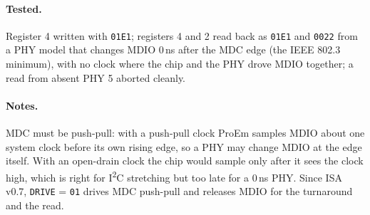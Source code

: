 \documentclass[11pt,a4paper]{article}
\newcommand{\sig}[1]{\texttt{#1}}
\begin{document}
\paragraph{Tested.} Register 4 written with \texttt{01E1}; registers 4 and 2 read back as \texttt{01E1} and \texttt{0022} from a PHY model that changes MDIO 0\,ns after the MDC edge (the IEEE 802.3 minimum), with no clock where the chip and the PHY drove MDIO together; a read from absent PHY 5 aborted cleanly.
\paragraph{Notes.} MDC must be push-pull: with a push-pull clock ProEm samples MDIO about one system clock before its own rising edge, so a PHY may change MDIO at the edge itself. With an open-drain clock the chip would sample only after it sees the clock high, which is right for I\textsuperscript{2}C stretching but too late for a 0\,ns PHY. Since ISA v0.7, \sig{DRIVE} = \texttt{01} drives MDC push-pull and releases MDIO for the turnaround and the read.
\end{document}
